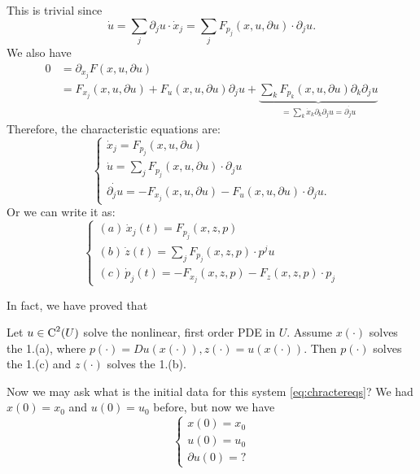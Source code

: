 This is trivial since 
\[
    \dot u = \sum_j \partial_j u \cdot \dot x_j = \sum_j F_{p_j}(x,u, \partial u) \cdot \partial_j u.
\]
We also have 
\begin{align*}
    0 &=\partial_{x_j} F(x, u, \partial u) \\
    &=F_{x_{j}}(x, u, \partial u)+F_{u}(x, u, \partial u) \partial_{j} u+\underbrace{\sum_k F_{p_{k}}(x, u, \partial u) \partial_{k} \partial_{j} u}_{=\sum_{k}\dot x_k \partial_k\partial_{j} u = \dot{\partial_j u}}
\end{align*}
Therefore, the characteristic equations are: 
\[
\begin{cases}
    \dot x_j = F_{p_j}(x,u,\partial u)\\
    \dot u = \sum_j F_{p_j}(x,u, \partial u) \cdot \partial_j u\\
    \dot{\partial_j u} = -F_{x_j}(x,u,\partial u) - F_u(x,u, \partial u)\cdot \partial_j u.
\end{cases}
\]
Or we can write it as: 
\begin{equation}
    \label{eq:chractereqs}
\begin{cases}
    (a) \, \dot x_j(t) = F_{p_j}(x,z,p)\\
    (b) \, \dot z(t) = \sum_j F_{p_j}(x,z,p) \cdot p^j u\\ 
    (c) \, \dot p_j(t) = -F_{x_j}(x,z,p) - F_z(x,z,p)\cdot p_j
\end{cases}
\end{equation}

In fact, we have proved that 
\begin{theorem}
     Let $u\in \operatorname{C}^2(U)$ solve the nonlinear, first order PDE in $U$. Assume $x(\cdot)$ solves the 1.(a), where $p(\cdot) = Du(x(\cdot)), z(\cdot) = u(x(\cdot))$. Then $p(\cdot)$ solves the 1.(c) and $z(\cdot)$ solves the 1.(b). 
\end{theorem}


Now we may ask what is the initial data for this system \eqref{eq:chractereqs}? We had $x(0) = x_0$ and $u(0) = u_0$ before, but now we have 
\[
\begin{cases}
    x(0) = x_0\\
    u(0) = u_0\\
    \partial u(0) = ?
\end{cases}
\]

